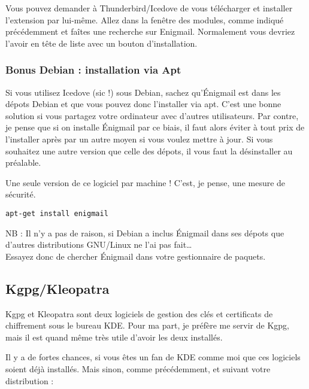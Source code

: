 Vous pouvez demander à Thunderbird/Icedove de vous télécharger et
installer l'extension par lui-même. Allez dans la fenêtre des modules, comme indiqué précédemment et faîtes
une recherche sur Enigmail. Normalement vous devriez l'avoir en tête de
liste avec un bouton d'installation.

\subsubsection{Bonus Debian : installation via Apt}\label{bonus-debian-installation-via-apt}

Si vous utilisez Icedove (sic !) sous Debian, sachez qu'Énigmail est
dans les dépots Debian et que vous pouvez donc l'installer via apt.
C'est une bonne solution si vous partagez votre ordinateur avec d'autres
utilisateurs. Par contre, je pense que si on installe Énigmail par ce biais, il faut
alors éviter à tout prix de l'installer après par un autre moyen si vous
voulez mettre à jour. Si vous souhaitez une autre version que celle des dépots, il vous faut
la désinstaller au préalable.

\begin{warning}
Une seule version de ce logiciel par machine ! C'est, je
pense, une mesure de sécurité.
\end{warning}

\begin{lstlisting}
apt-get install enigmail
\end{lstlisting}

\begin{notice}NB : Il n'y a pas de raison, si Debian a inclus Énigmail dans ses
dépots que d'autres distributions GNU/Linux ne l'ai pas
fait\ldots{}\\Essayez donc de chercher Énigmail dans votre gestionnaire
de paquets.
\end{notice}

\subsection{Kgpg/Kleopatra}\label{kgpgkleopatra}

Kgpg et Kleopatra sont deux logiciels de gestion des clés et certificats
de chiffrement sous le bureau KDE. Pour ma part, je préfère me servir de
Kgpg, mais il est quand même très utile d'avoir les deux installés.

Il y a de fortes chances, si vous êtes un fan de KDE comme moi que ces
logiciels soient déjà installés. Mais sinon, comme précédemment, et
suivant votre distribution :

